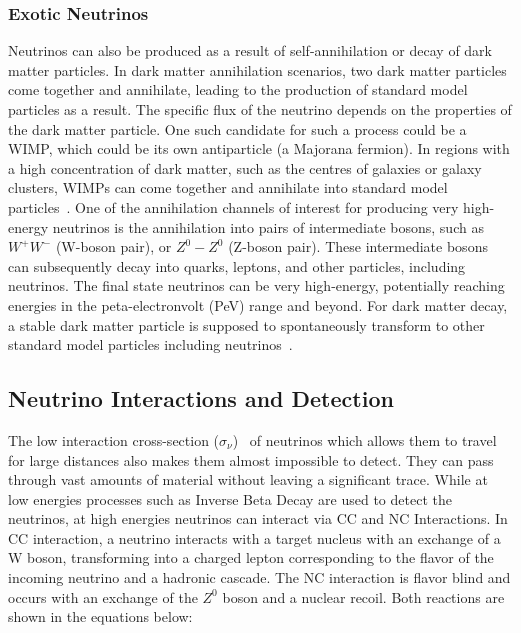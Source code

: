 \subsubsection*{Exotic Neutrinos}
\label{subsubsec:ExoticNu}
Neutrinos can also be produced as a result of self-annihilation or decay of dark matter particles. In dark matter annihilation scenarios, two dark matter particles come together and annihilate, leading to the production of standard model particles as a result. The specific flux of the neutrino depends on the properties of the dark matter particle. One such candidate for such a process could be a \gls{WIMP}, which could be its own antiparticle (a Majorana fermion). In regions with a high concentration of dark matter, such as the centres of galaxies or galaxy clusters, \glspl{WIMP} can come together and annihilate into standard model particles~\cite{10.1111/j.1365-2966.2008.13366.x}. One of the annihilation channels of interest for producing very high-energy neutrinos is the annihilation into pairs of intermediate bosons, such as $W^+W^-$ (W-boson pair), or $Z^0 - Z^0$ (Z-boson pair). These intermediate bosons can subsequently decay into quarks, leptons, and other particles, including neutrinos. The final state neutrinos can be very high-energy, potentially reaching energies in the peta-electronvolt (PeV) range and beyond. For dark matter decay, a stable dark matter particle is supposed to spontaneously transform to other standard model particles including neutrinos~\cite{PhysRevD.108.123021}. 

\subsection{Neutrino Interactions and Detection}
\label{subsec:Nuintdet}

The low interaction cross-section ($\sigma_{\nu}$)~\cite{Formaggio_2012} of neutrinos which allows them to travel for large distances also makes them almost impossible to detect. They can pass through vast amounts of material without leaving a significant trace. While at low energies processes such as Inverse Beta Decay are used to detect the neutrinos, at high energies neutrinos can interact via \gls{CC} and \gls{NC} Interactions. In \gls*{CC} interaction, a neutrino interacts with a target nucleus with an exchange of a W boson, transforming into a charged lepton corresponding to the flavor of the incoming neutrino and a hadronic cascade. The NC interaction is flavor blind and occurs with an exchange of the $Z^0$ boson and a nuclear recoil. Both reactions are shown in the equations below:

